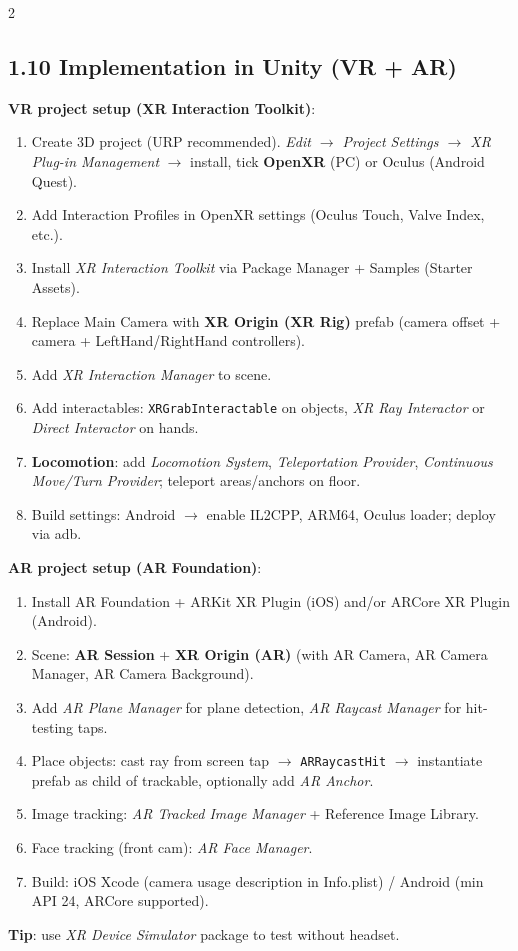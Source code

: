 \begin{paracol}{2}
\subsection*{1.10 Implementation in Unity (VR + AR)}
\textbf{VR project setup (XR Interaction Toolkit)}:
\begin{enumerate}[leftmargin=*,nosep]
  \item Create 3D project (URP recommended). \emph{Edit $\to$ Project Settings $\to$ XR Plug-in Management} $\to$ install, tick \textbf{OpenXR} (PC) or Oculus (Android Quest).
  \item Add Interaction Profiles in OpenXR settings (Oculus Touch, Valve Index, etc.).
  \item Install \emph{XR Interaction Toolkit} via Package Manager + Samples (Starter Assets).
  \item Replace Main Camera with \textbf{XR Origin (XR Rig)} prefab (camera offset + camera + LeftHand/RightHand controllers).
  \item Add \emph{XR Interaction Manager} to scene.
  \item Add interactables: \texttt{XRGrabInteractable} on objects, \emph{XR Ray Interactor} or \emph{Direct Interactor} on hands.
  \item \textbf{Locomotion}: add \emph{Locomotion System}, \emph{Teleportation Provider}, \emph{Continuous Move/Turn Provider}; teleport areas/anchors on floor.
  \item Build settings: Android $\to$ enable IL2CPP, ARM64, Oculus loader; deploy via adb.
\end{enumerate}
\textbf{AR project setup (AR Foundation)}:
\begin{enumerate}[leftmargin=*,nosep]
  \item Install AR Foundation + ARKit XR Plugin (iOS) and/or ARCore XR Plugin (Android).
  \item Scene: \textbf{AR Session} + \textbf{XR Origin (AR)} (with AR Camera, AR Camera Manager, AR Camera Background).
  \item Add \emph{AR Plane Manager} for plane detection, \emph{AR Raycast Manager} for hit-testing taps.
  \item Place objects: cast ray from screen tap $\to$ \texttt{ARRaycastHit} $\to$ instantiate prefab as child of trackable, optionally add \emph{AR Anchor}.
  \item Image tracking: \emph{AR Tracked Image Manager} + Reference Image Library.
  \item Face tracking (front cam): \emph{AR Face Manager}.
  \item Build: iOS Xcode (camera usage description in Info.plist) / Android (min API 24, ARCore supported).
\end{enumerate}
\textbf{Tip}: use \emph{XR Device Simulator} package to test without headset.


\end{paracol}
